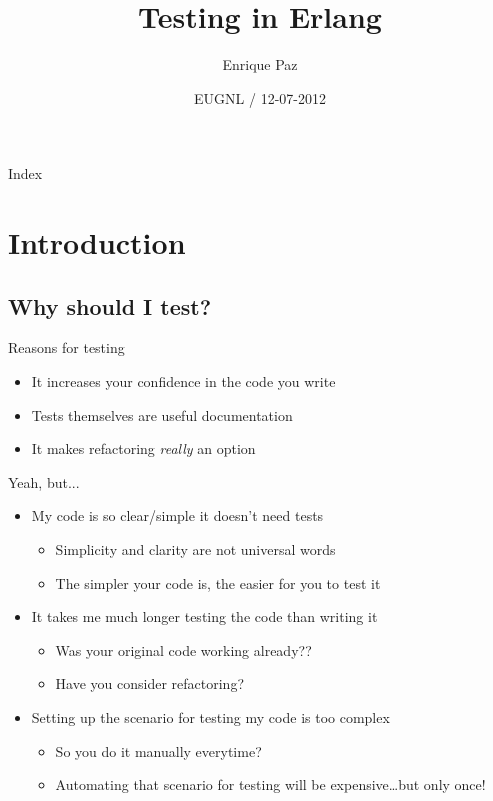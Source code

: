 \documentclass[pdf]{beamer}
\title[]{Testing in Erlang}
\author[] %
{Enrique Paz}
\institute[] %
{Senior Backend Developer @ Team Services}
\date[] %
{EUGNL / 12-07-2012}
\begin{document}
\begin{frame}
  \titlepage
\end{frame}

\begin{frame}{Index}
  \tableofcontents
\end{frame}

\section{Introduction}

\subsection*{Why should I test?}
\label{why_should_i_test}

\begin{frame}{Reasons for testing}
    \begin{itemize}
    \item It increases your confidence in the code you write
    \pause
    \item Tests themselves are useful documentation
    \pause
    \item It makes refactoring \emph{really} an option
    \end{itemize}
\end{frame}

\begin{frame}{Yeah, but...}
    \begin{itemize}
    \item My code is so clear/simple it doesn't need tests
        \begin{itemize}
        \pause
        \item Simplicity and clarity are not universal words
        \pause
        \item The simpler your code is, the easier for you to test it
        \end{itemize}
    \pause
    \item It takes me much longer testing the code than writing it
        \begin{itemize}
        \pause
        \item Was your original code working already??
        \pause
        \item Have you consider refactoring?
        \end{itemize}
    \pause
    \item Setting up the scenario for testing my code is too complex
        \begin{itemize}
        \pause
        \item So you do it manually everytime?
        \pause
        \item Automating that scenario for testing will be expensive\dots but only once!
        \end{itemize}
    \end{itemize}
\end{frame}
\end{document}
